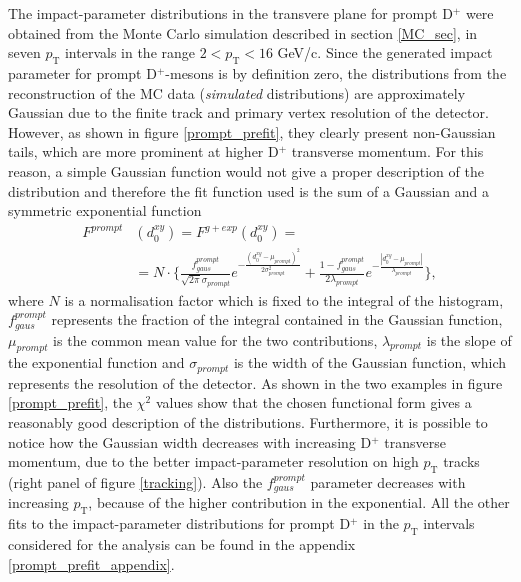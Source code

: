 \documentclass[b5paper,10pt,twoside,oldstyle,classica]{toptesi}
\newcommand{\pt}{p_\text{T}}
\begin{document}
The impact-parameter distributions in the transvere plane for prompt D$^+$ were obtained from the Monte Carlo simulation described in section \ref{MC_sec}, in seven $\pt$ intervals in the range $2<\pt<16$ GeV/c. Since the generated impact parameter for prompt D$^+$-mesons is by definition zero, the distributions from the reconstruction of the MC data (\textit{simulated} distributions) are approximately Gaussian due to the finite track and primary vertex resolution of the detector.  
However, as shown in figure \ref{prompt_prefit}, they clearly present non-Gaussian tails, which are more prominent at higher D$^+$ transverse momentum. For this reason, a simple Gaussian function would not give a proper description of the distribution and therefore the fit function used is the sum of a Gaussian and a symmetric exponential function
\begin{equation}
\begin{split}
F^{prompt}&(d_0^{xy}) = F^{g+exp}(d_0^{xy}) =\\
&=N\cdot \bigg\{\frac{f_{gaus}^{prompt}}{\sqrt{2\pi}\sigma_{prompt}}e^{-\frac{(d_0^{xy}-\mu_{prompt})^2}{2\sigma_{prompt}^2}}+\frac{1-f_{gaus}^{prompt}}{2\lambda_{prompt}}e^{-\frac{|d_0^{xy}-\mu_{prompt}|}{\lambda_{prompt}}}\bigg\},
\label{prompt_func}
\end{split}
\end{equation}
where $N$ is a normalisation factor which is fixed to the integral of the histogram, $f_{gaus}^{prompt}$ represents the fraction of the integral contained in the Gaussian function, $\mu_{prompt}$ is the common mean value for the two contributions, $\lambda_{prompt}$ is the slope of the exponential function and $\sigma_{prompt}$ is the width of the Gaussian function, which represents the resolution of the detector. As shown in the two examples in figure \ref{prompt_prefit}, the $\chi^2$ values show that the chosen functional form gives a reasonably good description of the distributions. Furthermore, it is possible to notice how the Gaussian width decreases with increasing D$^+$ transverse momentum, due to the better impact-parameter resolution on high $\pt$ tracks (right panel of figure \ref{tracking}). Also the $f_{gaus}^{prompt}$ parameter decreases with increasing $\pt$, because of the higher contribution in the exponential. All the other fits to the impact-parameter distributions for prompt D$^+$ in the $\pt$ intervals considered for the analysis can be found in the appendix \ref{prompt_prefit_appendix}.
\end{document}
